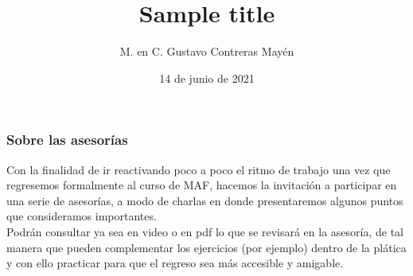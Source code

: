 \documentclass{beamer}
\title{Sample title}
\author{M. en C. Gustavo Contreras Mayén}
\date{14 de junio de 2021}
\begin{document}
\begin{frame}
\frametitle{Sobre las asesorías}
Con la finalidad de ir reactivando poco a poco el ritmo de trabajo una vez que regresemos formalmente al curso de MAF, hacemos la invitación a participar en una serie de asesorías, a modo de charlas en donde presentaremos algunos puntos que consideramos importantes.
\\
\bigskip
\pause
Podrán consultar ya sea en video o en pdf lo que se revisará en la asesoría, de tal manera que pueden complementar los ejercicios (por ejemplo) dentro de la plática y con ello practicar para que el regreso sea más accesible y amigable.
\end{frame}
\end{document}
